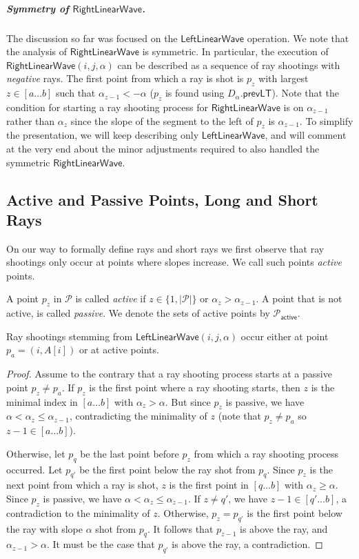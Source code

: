 \documentclass[a4paper,UKenglish,cleveref, autoref, thm-restate]{lipics-v2021}
\newcommand{\LLW}{\mathsf{LeftLinearWave}}
\newcommand{\RLW}{\mathsf{RightLinearWave}}
\newcommand{\longrange}{\text{long }}
\newcommand{\prevLT}{\mathsf{prevLT}}
\renewcommand{\P}{\mathcal{P}}
\newcommand{\AP}{\P_{\mathsf{active}}}
\newcommand{\para}[1]{\vspace{-0.1in} \subparagraph*{#1}}
\begin{document}
\para{Symmetry of $\RLW$.}
The discussion so far was focused on the $\LLW$ operation.
We note that the analysis of $\RLW$ is symmetric.
In particular, the execution of $\RLW(i,j,\alpha)$ can be described as a sequence of ray shootings with \emph{negative} rays.
The first point from which a ray is shot is $p_z$ with largest $z\in[a\ldots b]$ such that $\alpha_{z-1}<-\alpha$ ($p_z$ is found using $D_{\alpha}.\prevLT$). 
Note that the condition for starting a ray shooting process for $\RLW$ is on $\alpha_{z-1}$ rather than $\alpha_z$ since the slope of the segment to the left of $p_z$ is $\alpha_{z-1}$.
To simplify the presentation, we will keep describing only $\LLW$, and will comment at the very end about the minor adjustments required to also handled the symmetric $\RLW$. 

\subsection{Active and Passive Points, Long and Short Rays}
On our way to formally define \longrange rays and short rays we first observe that ray shootings only occur at points where slopes increase. We call such points {\em active} points.
\begin{definition}\label{def:activepoints}
A point $p_z$ in $\P$ is called \emph{active} if $z\in\{1,|\P|\}$ or $\alpha_z>\alpha_{z-1}$.
A point that is not active, is called \emph{passive}.
We denote the sets of active points by $\AP$.
\end{definition}

\begin{lemma}\label{lem:activerays}
Ray shootings stemming from $\LLW(i,j,\alpha)$ occur either at point $p_a=(i,A[i])$ or at active points. 
   
\end{lemma}
\begin{proof}
Assume to the contrary that a ray shooting process starts at a passive point $p_z \neq p_a$.
 If $p_z$ is the first point where a ray shooting starts, then $z$ is the minimal index in $[a\ldots b]$ with $\alpha_z > \alpha$. But since $p_z$ is passive, we have $\alpha < \alpha_{z} \le \alpha_{z-1}$, contradicting the minimality of $z$ (note that $p_{z} \neq p_a$ so $z-1 \in [a\ldots b]$).

Otherwise, let $p_q$ be the last point before $p_z$ from which a ray shooting process occurred.
Let $p_{q'}$ be the first point below the ray shot from $p_q$. Since $p_z$ is the next point from which a ray is shot, $z$ is the first point in $[q \ldots b]$ with $\alpha_z \ge \alpha$.
Since $p_z$ is passive, we have $\alpha < \alpha_{z} \le \alpha_{z-1}$.
If $z \neq q'$, we have $z-1 \in [q'\ldots b]$, a contradiction to the minimality of $z$.
Otherwise, $p_z = p_{q'}$ is the first point below the ray with slope $\alpha$ shot from $p_q$. 
It follows that $p_{z-1}$ is above the ray, and $\alpha_{z-1} > \alpha$.
It must be the case that $p_{q'}$ is above the ray, a contradiction.
\end{proof}
\end{document}
